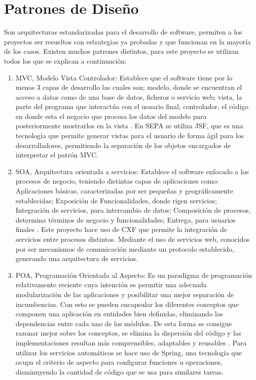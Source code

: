 \documentclass[a4paper,12pt,openany,oneside]{book}
\begin{document}
\section{Patrones de Diseño}
Son arquitecturas estandarizadas para el desarrollo de software, permiten a los proyectos ser resueltos con estrategias ya probadas y que funcionan en la mayoría de los casos. Existen muchos patrones distintos, para este proyecto se utilizan todos los que se explican a continuación:

\begin{enumerate}

\item MVC, Modelo Vista Controlador: Establece que el software tiene por lo menos 3 capas de desarrollo las cuales son; modelo, donde se encuentran el acceso a datos como de una base de datos, ficheros o servicio web; vista, la parte del programa que interactúa con el usuario final; controlador, el código en donde esta el negocio que procesa los datos del modelo para posteriormente mostrarlos en la vista \cite{data22}. En SEPA se utiliza JSF, que es una tecnología que permite generar vistas para el usuario de forma ágil para los desarrolladores, permitiendo la separación de los objetos encargados de interpretar el patrón MVC.

\item SOA, Arquitectura orientada a servicios: Establece el software enfocado a los procesos de negocio, teniendo distintas capas de aplicaciones como: Aplicaciones básicas, caracterizadas por ser pequeñas y geográficamente establecidas; Exposición de Funcionalidades, donde rigen servicios; Integración de servicios, para intercambio de datos; Composición de procesos, determina términos de negocio y funcionalidades; Entrega, para usuarios finales \cite{data23}. Este proyecto hace uso de CXF que permite la integración de servicios entre procesos distintos. Mediante el uso de servicios web, conocidos por ser mecanismos de comunicación mediante un protocolo establecido, generando una arquitectura de servicios.

\item POA, Programación Orientada al Aspecto: Es un paradigma de programación relativamente reciente cuya intención es permitir una adecuada modularización de las aplicaciones y posibilitar una mejor separación de incumbencias. Con esto se pueden encapsular los diferentes conceptos que componen una aplicación en entidades bien definidas, eliminando las dependencias entre cada uno de los módulos. De esta forma se consigue razonar mejor sobre los conceptos, se elimina la dispersión del código y las implementaciones resultan más comprensibles, adaptables y reusables \cite{data24}. Para utilizar los servicios automáticos se hace uso de Spring, una tecnología que ocupa el criterio de aspecto para configurar funciones u operaciones, disminuyendo la cantidad de código que se usa para similares tareas.


\end{enumerate}
\end{document}
